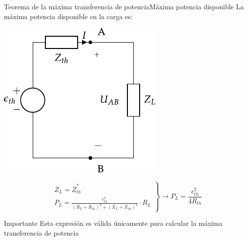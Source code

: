 \documentclass[aspectratio=169, xcolor={usenames,svgnames,dvipsnames}]{beamer}
\begin{document}
\begin{frame}{Teorema de la máxima transferencia de potencia}{Máxima potencia disponible}
La máxima potencia disponible en la carga es:

\vspace{5mm}
\begin{minipage}[c]{0.4\linewidth}
\begin{center}
\includegraphics[height=0.45\textheight]{../figs/EquivalenteThevenin2.pdf}
\end{center}
\end{minipage}
\hfill
\begin{minipage}[c]{0.59\linewidth}
\begin{equation*}
  \left.
    \begin{matrix}
      \overline{Z}_L = \overline{Z}_{th}^*\\
      P_L = \frac{\epsilon_{th}^2}{{(R_L+R_{th})^2+(X_L+X_{th})^2}} \cdot R_L
    \end{matrix} \right\}\rightarrow
  \boxed{P_L = \frac{\epsilon^2_{th}}{4 R_{th}}}
\end{equation*}

\begin{block}{Importante}
Esta expresión es \alert{válida únicamente} para calcular la máxima transferencia de potencia
\end{block}
\end{minipage}
\end{frame}
\end{document}
